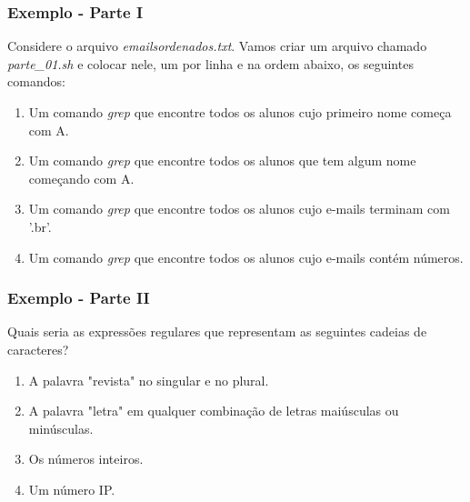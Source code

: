 \documentclass{beamer}
\begin{document}
   \begin{frame}
      \frametitle{Exemplo - Parte I}
      Considere o arquivo \textit{emailsordenados.txt}. Vamos criar um arquivo chamado \textit{parte\_01.sh} e colocar nele, 
      um por linha e na ordem abaixo, os seguintes comandos:
      \begin{enumerate}
         \item Um comando \textit{grep} que encontre todos os alunos cujo primeiro nome começa com A.
	      \item Um comando \textit{grep} que encontre todos os alunos que tem algum nome começando com A.
	      \item Um comando \textit{grep} que encontre todos os alunos cujo e-mails terminam com '.br'.
	      \item Um comando \textit{grep} que encontre todos os alunos cujo e-mails contém números.
      \end{enumerate}
   \end{frame}

   \begin{frame}
      \frametitle{Exemplo - Parte II}
      Quais seria as expressões regulares que representam as seguintes cadeias de caracteres?
      \begin{enumerate}
         \item A palavra "revista" no singular e no plural.
	      \item A palavra "letra" em qualquer combinação de letras maiúsculas ou minúsculas.
	      \item Os números inteiros.
	      \item Um número IP.
      \end{enumerate}
   \end{frame}

\end{document}
